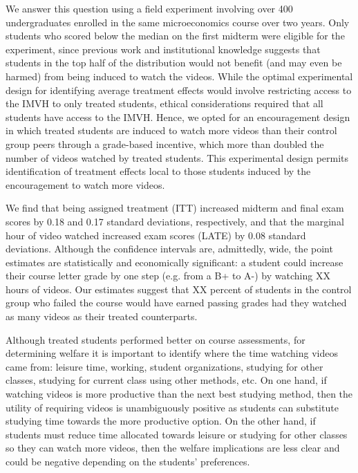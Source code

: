 \documentclass[12pt]{article}
\begin{document}
We answer this question using a field experiment involving over 400 undergraduates enrolled in the same microeconomics course over two years. Only students who scored below the median on the first midterm were eligible for the experiment, since previous work and institutional knowledge suggests that students in the top half of the distribution would not benefit (and may even be harmed) from being induced to watch the videos. While the optimal experimental design for identifying average treatment effects would involve restricting access to the IMVH to only treated students, ethical considerations required that all students have access to the IMVH. Hence, we opted for an encouragement design in which treated students are induced to watch more videos than their control group peers through a grade-based incentive, which more than doubled the number of videos watched by treated students. This experimental design permits identification of treatment effects local to those students induced by the encouragement to watch more videos.

We find that being assigned treatment (ITT) increased midterm and final exam scores by 0.18 and 0.17 standard deviations, respectively, and that the marginal hour of video watched increased exam scores (LATE) by 0.08 standard deviations. Although the confidence intervals are, admittedly, wide, the point estimates are statistically and economically significant: a student could increase their course letter grade by one step (e.g. from a B+ to A-) by watching XX hours of videos. Our estimates suggest that XX percent of students in the control group who failed the course would have earned passing grades had they watched as many videos as their treated counterparts.

Although treated students performed better on course assessments, for determining welfare it is important to identify where the time watching videos came from: leisure time, working, student organizations, studying for other classes, studying for current class using other methods, etc. On one hand, if watching videos is more productive than the next best studying method, then the utility of requiring videos is unambiguously positive as students can substitute studying time towards the more productive option. On the other hand, if students must reduce time allocated towards leisure or studying for other classes so they can watch more videos, then the welfare implications are less clear and could be negative depending on the students' preferences.
\end{document}
